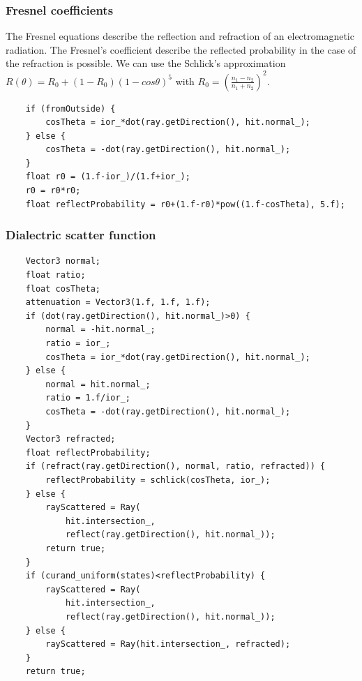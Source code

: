 \documentclass{article}
\begin{document}
\subsubsection{Fresnel coefficients}
The Fresnel equations describe the reflection and refraction of an electromagnetic radiation. The Fresnel's coefficient describe the reflected probability in the case of the refraction is possible. We can use the Schlick's approximation $R(\theta) = R_0 + (1-R_0)(1-cos\theta)^5$ with $R_0 = (\frac{n_1 - n_2}{n_1 + n_2})^2$.
\begin{lstlisting}
	if (fromOutside) {
		cosTheta = ior_*dot(ray.getDirection(), hit.normal_);
	} else {
		cosTheta = -dot(ray.getDirection(), hit.normal_);
	}
	float r0 = (1.f-ior_)/(1.f+ior_);
	r0 = r0*r0;
	float reflectProbability = r0+(1.f-r0)*pow((1.f-cosTheta), 5.f);
\end{lstlisting}

\newpage
\subsubsection{Dialectric scatter function}
\begin{lstlisting}
	Vector3 normal;
	float ratio;
	float cosTheta;
	attenuation = Vector3(1.f, 1.f, 1.f);
	if (dot(ray.getDirection(), hit.normal_)>0) {
		normal = -hit.normal_;
		ratio = ior_;
		cosTheta = ior_*dot(ray.getDirection(), hit.normal_);
	} else {
		normal = hit.normal_;
		ratio = 1.f/ior_;
		cosTheta = -dot(ray.getDirection(), hit.normal_);
	}
	Vector3 refracted;
	float reflectProbability;
	if (refract(ray.getDirection(), normal, ratio, refracted)) {
		reflectProbability = schlick(cosTheta, ior_);
	} else {
		rayScattered = Ray(
			hit.intersection_,
			reflect(ray.getDirection(), hit.normal_));
		return true;
	}
	if (curand_uniform(states)<reflectProbability) {
		rayScattered = Ray(
			hit.intersection_,
			reflect(ray.getDirection(), hit.normal_));
	} else {
		rayScattered = Ray(hit.intersection_, refracted);
	}
	return true;
\end{lstlisting}

\newpage
\end{document}
